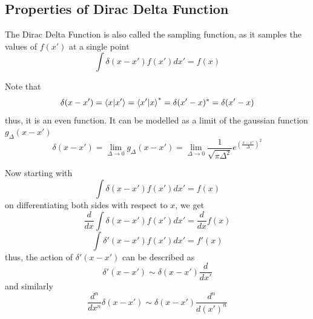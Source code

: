 \documentclass[12pt,a4paper]{report}
\newcommand{\der}[2]{\frac{d#1}{d#2}}
\newcommand{\nder}[3]{\frac{d^#3#1}{d#2^#3}}
\begin{document}
\subsection{Properties of Dirac Delta Function}

The Dirac Delta Function is also called the sampling function, as it samples the values of $f(x')$ at a single point
\begin{equation*}
    \int \delta(x-x') f(x') dx' = f(x)
\end{equation*}

Note that
\begin{equation*}
    \delta(x-x') = \bra{x}\ket{x'} = \bra{x'}\ket{x}^* = \delta(x'-x)^* = \delta(x'-x)
\end{equation*}
thus, it is an even function. It can be modelled as a limit of the gaussian function $g_\Delta(x-x')$
\begin{equation*}
    \delta(x-x') = \lim_{\Delta \to 0} g_\Delta(x-x') = \lim_{\Delta \to 0}\frac{1}{\sqrt{\pi\Delta^2}} e^{\left( \frac{x-x'}{\Delta} \right)^2}
\end{equation*}

Now starting with
\begin{equation*}
    \int \delta(x-x') f(x') dx' = f(x)
\end{equation*}
on differentiating both sides with respect to $x$, we get
\begin{equation*}
    \der{}{x}\int \delta(x-x') f(x') dx' = \der{}{x}f(x)
\end{equation*}
\begin{equation*}
    \int \delta'(x-x') f(x') dx' = f'(x)
\end{equation*}
thus, the action of $\delta'(x-x')$ can be described as
\begin{equation*}
    \delta'(x-x') \sim \delta(x-x') \der{}{x'}
\end{equation*}
and similarly
\begin{equation*}
    \nder{}{x}{n}\delta(x-x') \sim \delta(x-x') \nder{}{(x')}{n}
\end{equation*}
\end{document}
